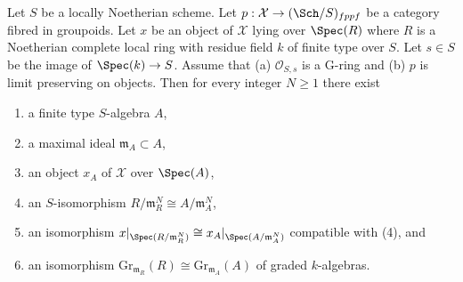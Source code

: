 \begin{lemma}
\label{lemma-approximate}
Let $S$ be a locally Noetherian scheme. Let
$p : \mathcal{X} \to (\Sch/S)_{fppf}$ be a category
fibred in groupoids. Let $x$ be an object of
$\mathcal{X}$ lying over $\Spec(R)$ where $R$ is a Noetherian complete
local ring with residue field $k$ of finite type over $S$. Let $s \in S$
be the image of $\Spec(k) \to S$. Assume that (a) $\mathcal{O}_{S, s}$ is
a G-ring and (b) $p$ is limit preserving on objects. Then for every
integer $N \geq 1$ there exist
\begin{enumerate}
\item a finite type $S$-algebra $A$,
\item a maximal ideal $\mathfrak m_A \subset A$,
\item an object $x_A$ of $\mathcal{X}$ over $\Spec(A)$,
\item an $S$-isomorphism $R/\mathfrak m_R^N \cong A/\mathfrak m_A^N$,
\item an isomorphism
$x|_{\Spec(R/\mathfrak m_R^N)} \cong x_A|_{\Spec(A/\mathfrak m_A^N)}$
compatible with (4), and
\item an isomorphism
$\text{Gr}_{\mathfrak m_R}(R) \cong \text{Gr}_{\mathfrak m_A}(A)$
of graded $k$-algebras.
\end{enumerate}
\end{lemma}


